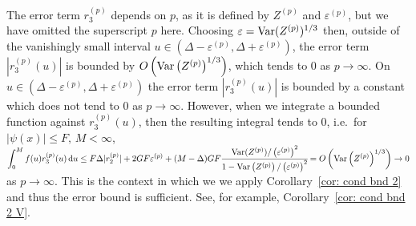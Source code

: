 The error term \(r_3^{(p)}\) depends on \(p\), as it is defined by \(Z^{(p)}\) and \(\varepsilon^{(p)}\), but we have omitted the superscript \(p\) here. Choosing \(\varepsilon=\mathrm{Var}(Z^{(p)})^{1/3}\) then, outside of the vanishingly small interval \(u\in(\Delta-\varepsilon^{(p)},\Delta+\varepsilon^{(p)})\), the error term \(|r_3^{(p)}(u)|\) is bounded by \(O\left(\mathrm{Var}\left(Z^{(p)}\right)^{1/3}\right)\), which tends to 0 as \(p\to\infty\). On \(u\in(\Delta-\varepsilon^{(p)},\Delta+\varepsilon^{(p)})\) the error term \(|r_3^{(p)}(u)|\) is bounded by a constant which does not tend to \(0\) as \(p \to \infty\). However, when we integrate a bounded function against \(r_3^{(p)}(u)\), then the resulting integral tends to \(0\), i.e.~for \(|\psi(x)|\leq F, \, M<\infty\), \(\displaystyle \int_{0}^M f(u) r_3^{(p)}(u)\, \mathrm{d} u\leq F\Delta |r_2^{(p)}| + 2GF\varepsilon^{(p)} + (M-\Delta)GF\cfrac{\mathrm{Var}(Z^{(p)})/\left(\varepsilon^{(p)}\right)^2}{1-\mathrm{Var}\left(Z^{(p)}\right)/\left(\varepsilon^{(p)}\right)^2}=O\left(\mathrm{Var}\left(Z^{(p)}\right)^{1/3}\right)\to 0 \) as \(p\to\infty\). This is the context in which we we apply Corollary~\ref{cor: cond bnd 2} and thus the error bound is sufficient. See, for example, Corollary~\ref{cor: cond bnd 2 V}. 

